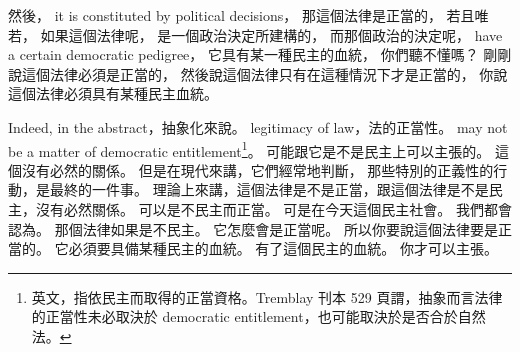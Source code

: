 \hypertarget{w02:cue:1597}{}然後，
\hypertarget{w02:cue:1598}{}it is constituted by political decisions，
\hypertarget{w02:cue:1599}{}那這個法律是正當的，
\hypertarget{w02:cue:1600}{}若且唯若，
\hypertarget{w02:cue:1601}{}如果這個法律呢，
\hypertarget{w02:cue:1602}{}是一個政治決定所建構的，
\hypertarget{w02:cue:1603}{}而那個政治的決定呢，
\hypertarget{w02:cue:1604}{}have a certain democratic pedigree，
\hypertarget{w02:cue:1605}{}它具有某一種民主的血統，
\hypertarget{w02:cue:1606}{}你們聽不懂嗎？
\hypertarget{w02:cue:1607}{}剛剛說這個法律必須是正當的，
\hypertarget{w02:cue:1608}{}然後說這個法律只有在這種情況下才是正當的，
\hypertarget{w02:cue:1609}{}你說這個法律必須具有某種民主血統。

\hypertarget{w02:cue:1610}{}Indeed, in the abstract，抽象化來說。
\hypertarget{w02:cue:1611}{}legitimacy of law，法的正當性。
\hypertarget{w02:cue:1612}{}may not be a matter of democratic entitlement\footnote{英文，指依民主而取得的正當資格。Tremblay 刊本 529 頁謂，抽象而言法律的正當性未必取決於 democratic entitlement，也可能取決於是否合於自然法。}。
\hypertarget{w02:cue:1613}{}可能跟它是不是民主上可以主張的。
\hypertarget{w02:cue:1614}{}這個沒有必然的關係。
\hypertarget{w02:cue:1615}{}但是在現代來講，它們經常地判斷，
\hypertarget{w02:cue:1616}{}那些特別的正義性的行動，是最終的一件事。
\hypertarget{w02:cue:1617}{}理論上來講，這個法律是不是正當，跟這個法律是不是民主，沒有必然關係。
\hypertarget{w02:cue:1618}{}可以是不民主而正當。
\hypertarget{w02:cue:1619}{}可是在今天這個民主社會。
\hypertarget{w02:cue:1620}{}我們都會認為。
\hypertarget{w02:cue:1621}{}那個法律如果是不民主。
\hypertarget{w02:cue:1622}{}它怎麼會是正當呢。
\hypertarget{w02:cue:1623}{}所以你要說這個法律要是正當的。
\hypertarget{w02:cue:1624}{}它必須要具備某種民主的血統。
\hypertarget{w02:cue:1625}{}有了這個民主的血統。
\hypertarget{w02:cue:1626}{}你才可以主張。

